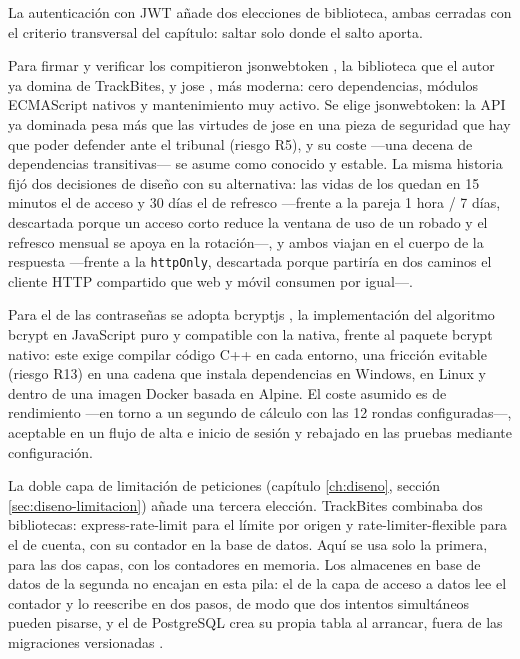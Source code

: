 La autenticación con \ac{JWT} añade dos elecciones de biblioteca, ambas cerradas con el criterio transversal del capítulo: saltar solo donde el salto aporta.

Para firmar y verificar los  compitieron jsonwebtoken \parencite{jsonwebtoken-docs}, la biblioteca que el autor ya domina de TrackBites, y jose \parencite{jose-docs}, más moderna: cero dependencias, módulos ECMAScript nativos y mantenimiento muy activo.
Se elige jsonwebtoken: la \ac{API} ya dominada pesa más que las virtudes de jose en una pieza de seguridad que hay que poder defender ante el tribunal (riesgo R5), y su coste —una decena de dependencias transitivas— se asume como conocido y estable.
La misma historia fijó dos decisiones de diseño con su alternativa: las vidas de los  quedan en 15 minutos el de acceso y 30 días el de refresco —frente a la pareja 1 hora / 7 días, descartada porque un acceso corto reduce la ventana de uso de un  robado y el refresco mensual se apoya en la rotación—, y ambos viajan en el cuerpo de la respuesta —frente a la  \texttt{httpOnly}, descartada porque partiría en dos caminos el cliente \ac{HTTP} compartido que web y móvil consumen por igual—.

Para el  de las contraseñas se adopta bcryptjs \parencite{bcryptjs-docs}, la implementación del algoritmo bcrypt en JavaScript puro y compatible con la nativa, frente al paquete bcrypt nativo: este exige compilar código C++ en cada entorno, una fricción evitable (riesgo R13) en una cadena que instala dependencias en Windows, en Linux y dentro de una imagen Docker basada en Alpine.
El coste asumido es de rendimiento —en torno a un segundo de cálculo con las 12 rondas configuradas—, aceptable en un flujo de alta e inicio de sesión y rebajado en las pruebas mediante configuración.

La doble capa de limitación de peticiones (capítulo \ref{ch:diseno}, sección \ref{sec:diseno-limitacion}) añade una tercera elección.
TrackBites combinaba dos bibliotecas: express-rate-limit \parencite{express-rate-limit-docs} para el límite por origen y rate-limiter-flexible \parencite{rate-limiter-flexible-docs} para el de cuenta, con su contador en la base de datos.
Aquí se usa solo la primera, para las dos capas, con los contadores en memoria.
Los almacenes en base de datos de la segunda no encajan en esta pila: el de la capa de acceso a datos lee el contador y lo reescribe en dos pasos, de modo que dos intentos simultáneos pueden pisarse, y el de PostgreSQL crea su propia tabla al arrancar, fuera de las migraciones versionadas \parencite{rate-limiter-flexible-docs}.

